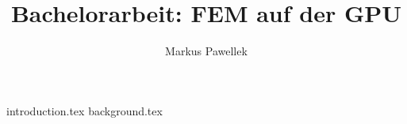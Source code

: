 \documentclass[10pt,fleqn,a4paper]{article}
\title{Bachelorarbeit: FEM auf der GPU}
\author{Markus Pawellek}
\begin{document}
  \maketitle

  \tableofcontents

  {introduction.tex}
  {background.tex}
\end{document}
